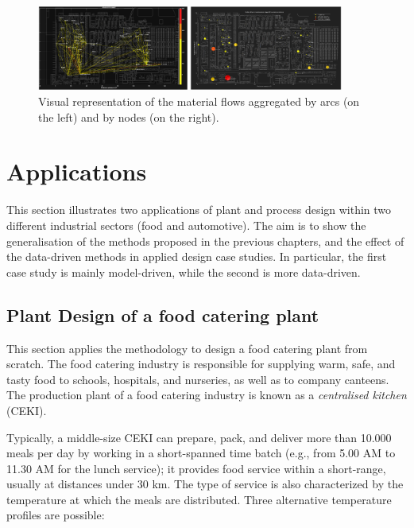 \begin{figure}[hbt!]
\centering
\includegraphics[width=0.9\textwidth]{sectionProduction/design_plant_figures/prod_layout_visual.png}
\captionsetup{type=figure}
\caption{Visual representation of the material flows aggregated by arcs (on the left) and by nodes (on the right).}
\label{prod_layout_visual}
\end{figure}

\section{Applications}
This section illustrates two applications of plant and process design within two different industrial sectors (food and automotive). The aim is to show the generalisation of the methods proposed in the previous chapters, and the effect of the data-driven methods in applied design case studies. In particular, the first case study is mainly model-driven, while the second is more data-driven.

\subsection{Plant Design of a food catering plant} \label{secCateringDesign}

This section applies the methodology to design a food catering plant from scratch. The food catering industry is responsible for supplying warm, safe, and tasty food to schools, hospitals, and nurseries, as well as to company canteens. The production plant of a food catering industry is known as a \textit{centralised kitchen} (CEKI).\par

Typically, a middle-size CEKI can prepare, pack, and deliver more than 10.000 meals per day by working in a short-spanned time batch (e.g., from 5.00 AM to 11.30 AM for the lunch service); it provides food service within a short-range, usually at distances under 30 km. The type of service is also characterized by the temperature at which the meals are distributed. Three alternative temperature profiles are possible:  

